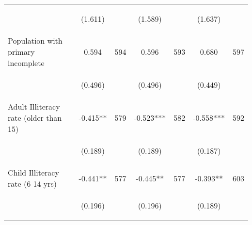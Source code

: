 \begin{tabular}{lcccccc}
\vspace{4pt} &  \begin{footnotesize}(1.611)\end{footnotesize}   & &
			    \begin{footnotesize}(1.589)\end{footnotesize}   & &
			    \begin{footnotesize}(1.637)\end{footnotesize}   &
			     \\          

Population with primary incomplete   &  0.594   &  594  &   0.596  &  593 &  0.680  &  597   \\

\vspace{4pt} &  \begin{footnotesize}(0.496)\end{footnotesize}   & &
			    \begin{footnotesize}(0.496)\end{footnotesize}   & &
			    \begin{footnotesize}(0.449)\end{footnotesize}   &
			     \\          

Adult Illiteracy rate (older than 15)   &  -0.415**   &  579  &   -0.523***  &  582 &  -0.558***  &  592   \\

\vspace{4pt} &  \begin{footnotesize}(0.189)\end{footnotesize}   & &
			    \begin{footnotesize}(0.189)\end{footnotesize}   & &
			    \begin{footnotesize}(0.187)\end{footnotesize}   &
			     \\          

Child Illiteracy rate (6-14 yrs)   &  -0.441**   &  577  &   -0.445**  &  577 &  -0.393**  &  603   \\

\vspace{4pt} &  \begin{footnotesize}(0.196)\end{footnotesize}   & &
			    \begin{footnotesize}(0.196)\end{footnotesize}   & &
			    \begin{footnotesize}(0.189)\end{footnotesize}   &
			     \\          


\end{tabular}
